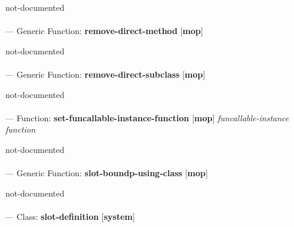 \begin{adjustwidth}{5em}{5em}
not-documented
\end{adjustwidth}

\paragraph{}
\label{MOP:REMOVE-DIRECT-METHOD}
--- Generic Function: \textbf{remove-direct-method} [\textbf{mop}] \textit{}

\begin{adjustwidth}{5em}{5em}
not-documented
\end{adjustwidth}

\paragraph{}
\label{MOP:REMOVE-DIRECT-SUBCLASS}
--- Generic Function: \textbf{remove-direct-subclass} [\textbf{mop}] \textit{}

\begin{adjustwidth}{5em}{5em}
not-documented
\end{adjustwidth}

\paragraph{}
\label{MOP:SET-FUNCALLABLE-INSTANCE-FUNCTION}
--- Function: \textbf{set-funcallable-instance-function} [\textbf{mop}] \textit{funcallable-instance function}

\begin{adjustwidth}{5em}{5em}
not-documented
\end{adjustwidth}

\paragraph{}
\label{MOP:SLOT-BOUNDP-USING-CLASS}
--- Generic Function: \textbf{slot-boundp-using-class} [\textbf{mop}] \textit{}

\begin{adjustwidth}{5em}{5em}
not-documented
\end{adjustwidth}

\paragraph{}
\label{SYSTEM:SLOT-DEFINITION}
--- Class: \textbf{slot-definition} [\textbf{system}] \textit{}

